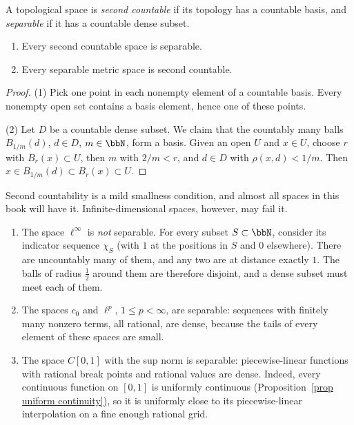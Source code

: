 \begin{defn}
    A topological space is \emph{second countable} if its topology has a countable basis, and \emph{separable} if it has a countable dense subset.
\end{defn}

\begin{prop}\label{prop second countable separable}
    \begin{enumerate}
        \item Every second countable space is separable.
        \item Every separable metric space is second countable.
    \end{enumerate}
\end{prop}
\begin{proof}
    (1) Pick one point in each nonempty element of a countable basis. Every nonempty open set contains a basis element, hence one of these points.

    (2) Let $D$ be a countable dense subset. We claim that the countably many balls $B_{1/m}(d)$, $d\in D$, $m\in\bbN$, form a basis. Given an open $U$ and $x\in U$, choose $r$ with $B_r(x)\subset U$, then $m$ with $2/m<r$, and $d\in D$ with $\rho(x,d)<1/m$. Then $x\in B_{1/m}(d)\subset B_r(x)\subset U$.
\end{proof}

Second countability is a mild smallness condition, and almost all spaces in this book will have it. Infinite-dimensional spaces, however, may fail it.

\begin{example}\label{example separability}
    \begin{enumerate}
        \item The space $\ell^\infty$ is \emph{not} separable. For every subset $S\subset\bbN$, consider its indicator sequence $\chi_S$ (with $1$ at the positions in $S$ and $0$ elsewhere). There are uncountably many of them, and any two are at distance exactly $1$. The balls of radius $\frac12$ around them are therefore disjoint, and a dense subset must meet each of them.
        \item The spaces $c_0$ and $\ell^p$, $1\leq p<\infty$, are separable: sequences with finitely many nonzero terms, all rational, are dense, because the tails of every element of these spaces are small.
        \item The space $C[0,1]$ with the sup norm is separable: piecewise-linear functions with rational break points and rational values are dense. Indeed, every continuous function on $[0,1]$ is uniformly continuous (Proposition~\ref{prop uniform continuity}), so it is uniformly close to its piecewise-linear interpolation on a fine enough rational grid.
    \end{enumerate}
\end{example}

